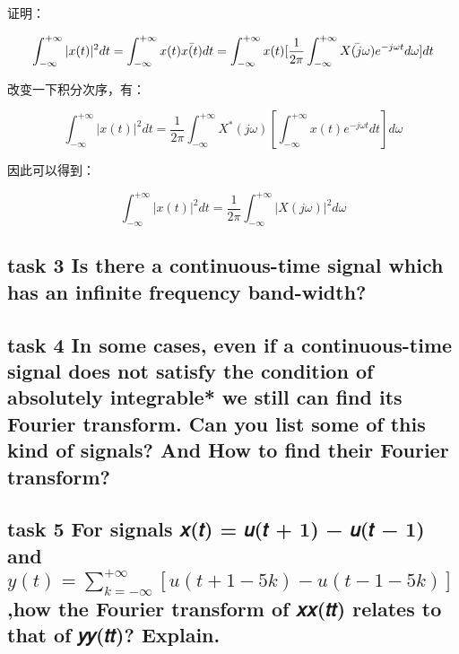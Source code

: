 \documentclass[
]{article}
\begin{document}
证明：

\[\int_{-\infty}^{+\infty}|x(t)|^2dt=\int_{-\infty}^{+\infty}x(t)\bar{x(t)}dt\\
=\int_{-\infty}^{+\infty}x(t)[\frac{1}{2\pi}\int_{-\infty}^{+\infty}\bar{X(j\omega)}e^{-j\omega t}d\omega]dt\]

改变一下积分次序，有：

\[\int_{-\infty}^{+\infty}|x(t)|^2dt = \frac{1}{2\pi}\int_{-\infty}^{+\infty}X^*(j\omega)[\int_{-\infty}^{+\infty}x(t)e^{-j\omega t}dt]d\omega\]

因此可以得到：

\[\int_{-\infty}^{+\infty}|x(t)|^2dt=\frac{1}{2\pi}\int_{-\infty}^{+\infty}|X(j\omega)|^2d\omega\]

\subsection{task 3 Is there a continuous-time signal which has an
infinite frequency
band-width?}\label{task-3-is-there-a-continuous-time-signal-which-has-an-infinite-frequency-band-width}

\subsection{task 4 In some cases, even if a continuous-time signal does
not satisfy the condition of absolutely integrable* we still can find
its Fourier transform. Can you list some of this kind of signals? And
How to find their Fourier
transform?}\label{task-4-in-some-cases-even-if-a-continuous-time-signal-does-not-satisfy-the-condition-of-absolutely-integrable-we-still-can-find-its-fourier-transform-can-you-list-some-of-this-kind-of-signals-and-how-to-find-their-fourier-transform}

\subsection{\texorpdfstring{task 5 For signals 𝑥(𝑡) = 𝑢(𝑡 + 1) − 𝑢(𝑡 −
1) and\(y(t)=\sum^{+\infty}_{k=-\infty}[u(t+1-5k)-u(t-1-5k)]\),how the
Fourier transform of 𝑥𝑥(𝑡𝑡) relates to that of 𝑦𝑦(𝑡𝑡)?
Explain.}{task 5 For signals 𝑥(𝑡) = 𝑢(𝑡 + 1) − 𝑢(𝑡 − 1) andy(t)=\textbackslash sum\^{}\{+\textbackslash infty\}\_\{k=-\textbackslash infty\}{[}u(t+1-5k)-u(t-1-5k){]},how the Fourier transform of 𝑥𝑥(𝑡𝑡) relates to that of 𝑦𝑦(𝑡𝑡)? Explain.}}\label{task-5-for-signals-ux1d465ux1d461--ux1d462ux1d461--1-ux2212-ux1d462ux1d461-ux2212-1-and-ux1d466--ux1d461---ux2211-ux1d458--ux2212-ux221e--ux221e--ux1d462--ux1d461--1-ux2212-5-ux1d458--ux2212-ux1d462--ux1d461-ux2212-1-ux2212-5-ux1d458---how-the-fourier-transform-of-ux1d465ux1d465ux1d461ux1d461-relates-to-that-of-ux1d466ux1d466ux1d461ux1d461-explain}
\end{document}
